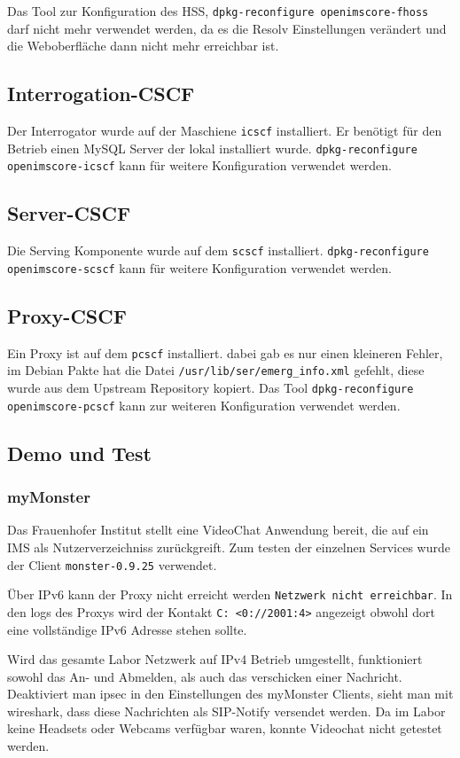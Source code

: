 Das Tool zur Konfiguration des HSS, \lstinline{dpkg-reconfigure openimscore-fhoss} darf nicht mehr verwendet werden, da es die Resolv Einstellungen verändert und die Weboberfläche dann nicht mehr erreichbar ist.

\subsection{Interrogation-CSCF}
Der Interrogator wurde auf der Maschiene \lstinline{icscf} installiert. Er benötigt für den Betrieb einen MySQL Server der lokal installiert wurde.
\lstinline{dpkg-reconfigure openimscore-icscf} kann für weitere Konfiguration verwendet werden.

\subsection{Server-CSCF}
Die Serving Komponente wurde auf dem \lstinline{scscf} installiert.
\lstinline{dpkg-reconfigure openimscore-scscf} kann für weitere Konfiguration verwendet werden.

\subsection{Proxy-CSCF}
Ein Proxy ist auf dem  \lstinline{pcscf} installiert. dabei gab es nur einen kleineren Fehler, im Debian Pakte hat die Datei \lstinline{/usr/lib/ser/emerg_info.xml} gefehlt, diese wurde aus dem Upstream Repository kopiert.
Das Tool \lstinline{dpkg-reconfigure openimscore-pcscf} kann zur weiteren Konfiguration verwendet werden.

\subsection{Demo und Test}

\subsubsection{myMonster}
Das Frauenhofer Institut stellt eine VideoChat Anwendung bereit, die auf ein IMS als Nutzerverzeichniss zurückgreift.
Zum testen der einzelnen Services wurde der Client \lstinline{monster-0.9.25} verwendet.

Über IPv6 kann der Proxy nicht erreicht werden \lstinline{Netzwerk nicht erreichbar}.
In den logs des Proxys wird der Kontakt \lstinline{C: <0://2001:4>} angezeigt obwohl dort eine vollständige IPv6 Adresse stehen sollte.

Wird das gesamte Labor Netzwerk auf IPv4 Betrieb umgestellt, funktioniert sowohl das An- und Abmelden, als auch das verschicken einer Nachricht. Deaktiviert man ipsec in den Einstellungen des myMonster Clients, sieht man mit wireshark, dass diese Nachrichten als SIP-Notify versendet werden. Da im Labor keine Headsets oder Webcams verfügbar waren, konnte Videochat nicht getestet werden.

